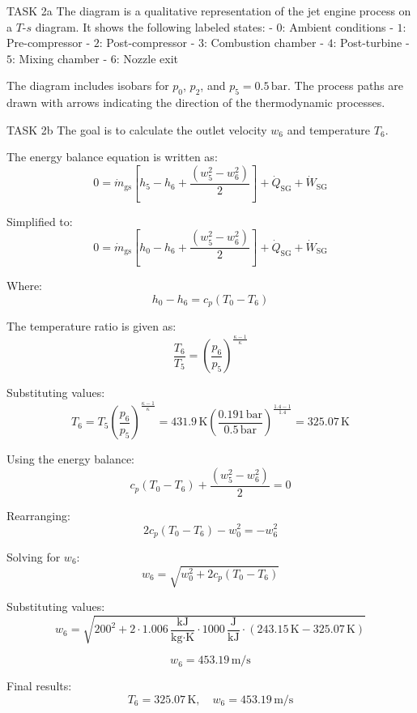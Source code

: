 TASK 2a  
The diagram is a qualitative representation of the jet engine process on a \( T \)-\( s \) diagram. It shows the following labeled states:  
- \( 0 \): Ambient conditions  
- \( 1 \): Pre-compressor  
- \( 2 \): Post-compressor  
- \( 3 \): Combustion chamber  
- \( 4 \): Post-turbine  
- \( 5 \): Mixing chamber  
- \( 6 \): Nozzle exit  

The diagram includes isobars for \( p_0 \), \( p_2 \), and \( p_5 = 0.5 \, \text{bar} \). The process paths are drawn with arrows indicating the direction of the thermodynamic processes.  

TASK 2b  
The goal is to calculate the outlet velocity \( w_6 \) and temperature \( T_6 \).  

The energy balance equation is written as:  
\[
0 = \dot{m}_{\text{gs}} \left[ h_5 - h_6 + \frac{(w_5^2 - w_6^2)}{2} \right] + \dot{Q}_{\text{SG}} + \dot{W}_{\text{SG}}
\]  

Simplified to:  
\[
0 = \dot{m}_{\text{gs}} \left[ h_0 - h_6 + \frac{(w_5^2 - w_6^2)}{2} \right] + \dot{Q}_{\text{SG}} + \dot{W}_{\text{SG}}
\]  

Where:  
\[
h_0 - h_6 = c_p (T_0 - T_6)
\]  

The temperature ratio is given as:  
\[
\frac{T_6}{T_5} = \left( \frac{p_6}{p_5} \right)^{\frac{\kappa - 1}{\kappa}}  
\]  

Substituting values:  
\[
T_6 = T_5 \left( \frac{p_6}{p_5} \right)^{\frac{\kappa - 1}{\kappa}} = 431.9 \, \text{K} \left( \frac{0.191 \, \text{bar}}{0.5 \, \text{bar}} \right)^{\frac{1.4 - 1}{1.4}} = 325.07 \, \text{K}
\]  

Using the energy balance:  
\[
c_p (T_0 - T_6) + \frac{(w_5^2 - w_6^2)}{2} = 0
\]  

Rearranging:  
\[
2 c_p (T_0 - T_6) - w_0^2 = -w_6^2
\]  

Solving for \( w_6 \):  
\[
w_6 = \sqrt{w_0^2 + 2 c_p (T_0 - T_6)}
\]  

Substituting values:  
\[
w_6 = \sqrt{200^2 + 2 \cdot 1.006 \, \frac{\text{kJ}}{\text{kg·K}} \cdot 1000 \, \frac{\text{J}}{\text{kJ}} \cdot (243.15 \, \text{K} - 325.07 \, \text{K})}
\]  

\[
w_6 = 453.19 \, \text{m/s}
\]  

Final results:  
\[
T_6 = 325.07 \, \text{K}, \quad w_6 = 453.19 \, \text{m/s}
\]